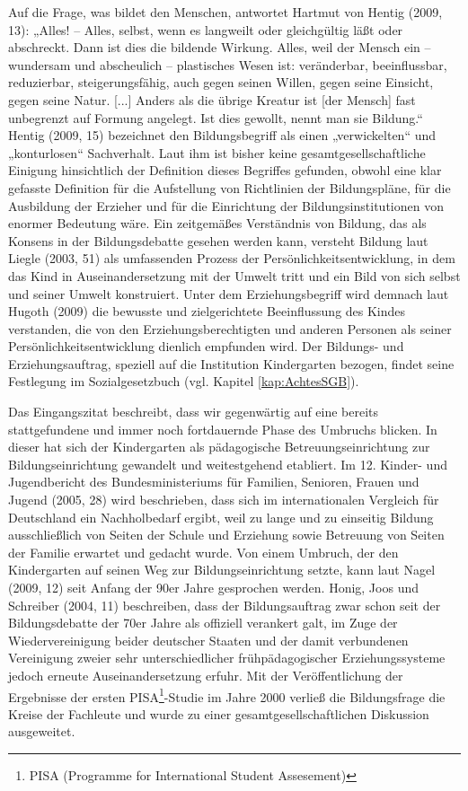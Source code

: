 Auf die Frage, was bildet den Menschen, antwortet Hartmut von Hentig (2009, 13): „Alles! -- Alles, selbst, wenn es langweilt oder gleichgültig läßt oder abschreckt. Dann ist dies die bildende Wirkung. Alles, weil der Mensch ein -- wundersam und abscheulich -- plastisches Wesen ist: veränderbar, be\-einflussbar, reduzierbar, steigerungsfähig, auch gegen seinen Willen, gegen seine Einsicht, gegen seine Natur. [...] Anders als die übrige Kreatur ist [der Mensch] fast unbegrenzt auf Formung angelegt. Ist dies gewollt, nennt man sie Bildung.“ 
Hentig (2009, 15) bezeichnet den Bildungsbegriff als einen „verwickelten“ und „konturlosen“ Sachverhalt. Laut ihm ist bisher keine gesamtgesellschaftliche Einigung hinsichtlich der Definition dieses Begriffes gefunden, obwohl eine klar gefasste Definition für die Aufstellung von Richtlinien der Bildungspläne, für die Ausbildung der Erzieher und für die Einrichtung der Bildungsinstitutionen von enormer Bedeutung wäre. 
Ein zeitgemäßes Verständnis von Bildung, das als Konsens in der Bildungsdebatte gesehen werden kann, versteht Bildung laut Liegle (2003, 51) als umfassenden Prozess der Persönlichkeitsentwicklung, in dem das Kind in Auseinandersetzung mit der Umwelt tritt und ein  Bild von sich selbst und seiner Umwelt konstruiert. Unter dem Erziehungsbegriff wird demnach laut Hugoth (2009) die bewusste und zielgerichtete Beeinflussung des Kindes verstanden, die von den Erziehungsberechtigten und anderen Personen als seiner Persönlichkeitsentwicklung dienlich empfunden wird. Der Bildungs- und Erziehungsauftrag, speziell auf die Institution Kindergarten bezogen, findet seine Festlegung im Sozialgesetzbuch (vgl. Kapitel \ref{kap:AchtesSGB}). 

Das Eingangszitat beschreibt, dass wir gegenwärtig auf eine bereits stattgefundene und immer noch fortdauernde Phase des Umbruchs blicken. In dieser hat sich der Kindergarten als pädagogische Betreuungseinrichtung zur Bildungseinrichtung gewandelt und weitestgehend etabliert. Im 12. Kinder- und Jugendbericht des Bundesministeriums für Familien, Senioren, Frauen und Jugend (2005, 28) wird beschrieben, dass sich im internationalen Vergleich für Deutschland ein Nachholbedarf ergibt, weil zu lange und zu einseitig Bildung ausschließlich von Seiten der Schule und Erziehung sowie Betreuung von Seiten der Familie erwartet und gedacht wurde. Von einem Umbruch, der den Kindergarten auf seinen Weg zur Bildungseinrichtung setzte, kann laut Nagel (2009, 12) seit Anfang der 90er Jahre gesprochen werden. Honig, Joos  und Schreiber (2004, 11) beschreiben, dass der Bildungsauftrag zwar schon seit der Bildungsdebatte der 70er Jahre als offiziell verankert galt, im Zuge der Wiedervereinigung beider deutscher Staaten und der damit verbundenen Vereinigung zweier sehr unterschiedlicher frühpädagogischer Erziehungssysteme jedoch erneute Auseinandersetzung erfuhr. Mit der Veröffentlichung der Ergebnisse der ersten PISA\footnote{PISA (Programme for International Student Assesement)}-Studie im Jahre 2000 verließ die Bildungsfrage die Kreise der Fachleute und wurde zu einer gesamtgesellschaftlichen Diskussion ausgeweitet.  

